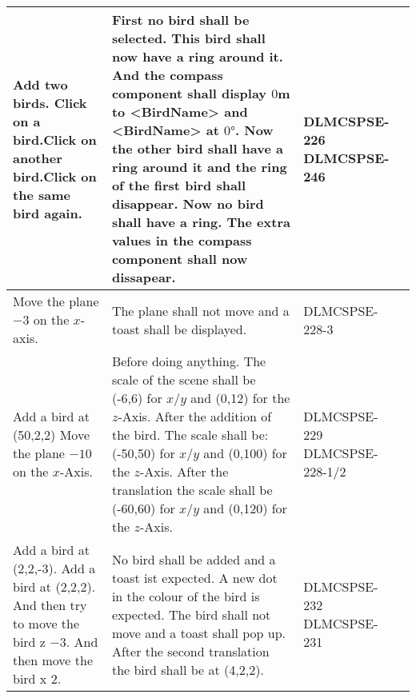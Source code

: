 \begin{xltabular}{\textwidth}{|X|X|M{3cm}|M{3cm}|}
  Add two birds. \newline Click on a bird.\newline Click on another bird.\newline Click on the same bird again.\newline & First no bird shall be selected. \newline This bird shall now have a ring around it. And the compass component shall display $0$m to <BirdName> and <BirdName> at $0°$. \newline Now the other bird shall have a ring around it and the ring of the first bird shall disappear. \newline Now no bird shall have a ring. The extra values in the compass component shall now dissapear. & {\color{purpleT}\ttfamily DLMCSPSE-226 \newline DLMCSPSE-246} &  \\ \hline 
  Move the plane $-3$ on the $x$-axis. & The plane shall not move and a toast shall be displayed. & {\color{purpleT}\ttfamily DLMCSPSE-228-3} &  \\ \hline 
  Add a bird at {\ttfamily (50,2,2)} \newline Move the plane $-10$ on the $x$-Axis. & Before doing anything. The scale of the scene shall be {\ttfamily (-6,6)} for $x$/$y$ and {\ttfamily (0,12)} for the $z$-Axis. \newline After the addition of the bird. The scale shall be: {\ttfamily (-50,50)} for $x$/$y$ and {\ttfamily (0,100)} for the $z$-Axis. \newline After the translation the scale shall be {\ttfamily (-60,60)} for $x$/$y$ and {\ttfamily (0,120)} for the $z$-Axis. & {\color{purpleT}\ttfamily DLMCSPSE-229 \newline DLMCSPSE-228-1/2} &  \\ \hline 
  Add a bird at {\ttfamily (2,2,-3)}. \newline  Add a bird at {\ttfamily (2,2,2)}. And then try to move the bird z $-3$. \newline And then move the bird x $2$. & No bird shall be added and a toast ist expected. \newline A new dot in the colour of the bird is expected. \newline The bird shall not move and a toast shall pop up. \newline After the second translation the bird shall be at {\ttfamily (4,2,2)}. & {\color{purpleT}\ttfamily DLMCSPSE-232 \newline DLMCSPSE-231} &  \\ \hline 

\end{xltabular}
